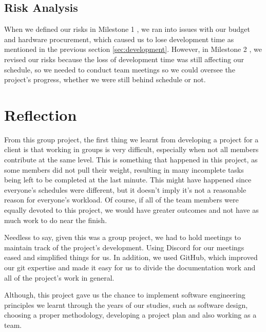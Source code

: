 
    \subsection{Risk Analysis}
    \label{ssec:}

    When we defined our risks in Milestone 1 \cite{coaker}, we ran into issues with our budget and hardware procurement, which caused us to lose development time as mentioned in the previous section \ref{sec:development}. However, in Milestone 2 \cite{mile2}, we revised our risks because the loss of development time was still affecting our schedule, so we needed to conduct team meetings so we could oversee the project's progress, whether we were still behind schedule or not.

    \section{Reflection}
    \label{sec:Reflection}

    From this group project, the first thing we learnt from developing a project for a client is that working in groups is very difficult, especially when not all members contribute at the same level. This is something that happened in this project, as some members did not pull their weight, resulting in many incomplete tasks being left to be completed at the last minute. This might have happened since everyone's schedules were different, but it doesn't imply it's not a reasonable reason for everyone's workload. Of course, if all of the team members were equally devoted to this project, we would have greater outcomes and not have as much work to do near the finish.

    Needless to say, given this was a group project, we had to hold meetings to maintain track of the project's development. Using Discord for our meetings eased and simplified things for us. In addition, we used GitHub, which improved our git expertise and made it easy for us to divide the documentation work and all of the project's work in general.

    Although, this project gave us the chance to implement software engineering principles we learnt through the years of our studies, such as software design, choosing a proper methodology, developing a project plan and also working as a team.

